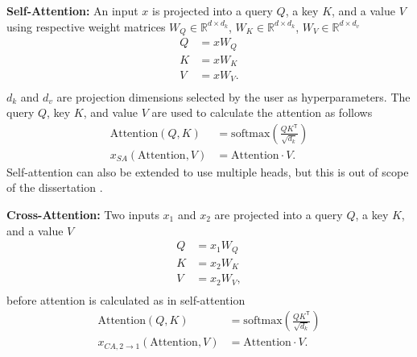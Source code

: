 \textbf{Self-Attention:} An input $x$ is projected into a query $Q$, a key $K$, and a value $V$ using respective weight matrices $W_Q \in \mathbb{R}^{d \times d_k}$, $W_K \in \mathbb{R}^{d \times d_k}$, $W_V \in \mathbb{R}^{d \times d_v}$
\begin{equation}
\begin{aligned}
    Q & = x W_Q \\
    K & = x W_K \\
    V & = x W_V. \\
\end{aligned}
\end{equation}
$d_k$ and $d_v$ are projection dimensions selected by the user as hyperparameters. The query $Q$, key $K$, and value $V$ are used to calculate the attention as follows
\begin{equation}
\begin{aligned}
    \text{Attention}(Q,K) & = \text{softmax} (\frac{Q K^{\mathsf{T}}}{\sqrt{d_k}}) \\
    x_{SA}(\text{Attention},V) & = \text{Attention} \cdot V.
\end{aligned}
\end{equation}
Self-attention can also be extended to use multiple heads, but this is out of scope of the dissertation \cite{vaswani2017attention}.

\textbf{Cross-Attention:} Two inputs $x_1$ and $x_2$ are projected into a query $Q$, a key $K$, and a value $V$
\begin{equation}
\begin{aligned}
    Q & = x_1 W_Q \\
    K & = x_2 W_K \\
    V & = x_2 W_V, \\
\end{aligned}
\end{equation}
before attention is calculated as in self-attention
\begin{equation}
\begin{aligned}
    \text{Attention}(Q,K) & = \text{softmax} (\frac{Q K^{\mathsf{T}}}{\sqrt{d_k}}) \\
    x_{CA,2 \rightarrow 1}(\text{Attention},V) & = \text{Attention} \cdot V.
\end{aligned}
\end{equation}
